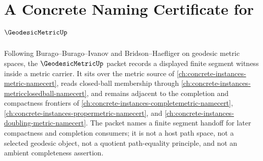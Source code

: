 \chapter{A Concrete Naming Certificate for $\GeodesicMetricUp$}
\label{ch:concrete-instances-geodesic-metric-namecert}

Following Burago--Burago--Ivanov and Bridson--Haefliger on geodesic metric spaces, the $\GeodesicMetricUp$ packet records a displayed finite segment witness inside a metric carrier. It sits over the metric source of \autoref{ch:concrete-instances-metric-namecert}, reads closed-ball membership through \autoref{ch:concrete-instances-metricclosedball-namecert}, and remains adjacent to the completion and compactness frontiers of \autoref{ch:concrete-instances-completemetric-namecert}, \autoref{ch:concrete-instances-propermetric-namecert}, and \autoref{ch:concrete-instances-doubling-metric-namecert}. The packet names a finite segment handoff for later compactness and completion consumers; it is not a host path space, not a selected geodesic object, not a quotient path-equality principle, and not an ambient completeness assertion.

